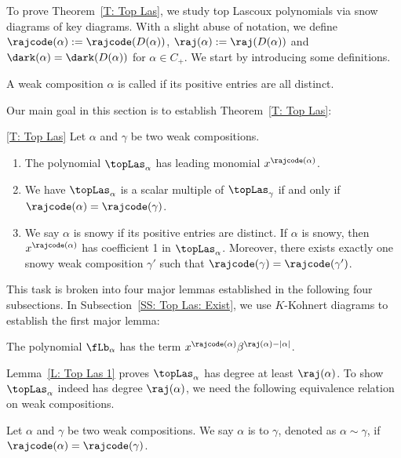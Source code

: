 To prove Theorem~\ref{T: Top Las},
we study top Lascoux polynomials via snow diagrams of key diagrams.
With a slight abuse of notation, we
define $\rajcode(\alpha) := \rajcode(D(\alpha))$, $\raj(\alpha) := \raj(D(\alpha))$
and $\dark(\alpha) = \dark(D(\alpha))$
for $\alpha \in C_+$.
We start by introducing some definitions.

\begin{defn}
A weak composition $\alpha$ is called 
if its positive entries are all distinct. 
\end{defn}

Our main goal in this section is to establish 
Theorem~\ref{T: Top Las}:

\begin{manualtheorem}{\ref{T: Top Las}}
Let $\alpha$ and $\gamma$ be two weak compositions. 
\begin{enumerate}
\item[(a)]
The polynomial $\topLas_\alpha$ has leading monomial $x^{\rajcode(\alpha)}$.
\item[(b)] We have
$\topLas_\alpha$ is a scalar multiple of $\topLas_{\gamma}$
if and only if $\rajcode(\alpha) = \rajcode(\gamma)$.
\item[(c)] 
We say $\alpha$ is snowy if its
positive entries are distinct.
If $\alpha$ is snowy, then $x^{\rajcode(\alpha)}$ has coefficient 1 in $\topLas_\alpha$.
Moreover, 
there exists exactly one snowy weak composition $\gamma'$ 
such that $\rajcode(\gamma) = \rajcode(\gamma')$.
\end{enumerate}  
\end{manualtheorem}

This task is broken into four major lemmas
established in the following four subsections. 
In Subsection~\ref{SS: Top Las: Exist}, 
we use $K$-Kohnert diagrams to establish the first major lemma:

\begin{lemma}
\label{L: Top Las 1}
The polynomial $\fLb_\alpha$ has the term $x^{\rajcode(\alpha)} \beta^{\raj(\alpha) - |\alpha|}$.  
\end{lemma}

 


Lemma~\ref{L: Top Las 1} proves
$\topLas_\alpha$ has degree at least $\raj(\alpha)$.
To show $\topLas_\alpha$ indeed has degree $\raj(\alpha)$,
we need the following equivalence relation on weak compositions. 

\begin{defn}
Let $\alpha$ and $\gamma$ be two weak compositions. 
We say $\alpha$ is  to $\gamma$, 
denoted as $\alpha \sim \gamma$, 
if $\rajcode(\alpha) = \rajcode(\gamma)$. 
\end{defn}

